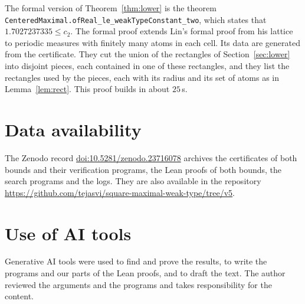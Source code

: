 \documentclass[11pt]{amsart}
\theoremstyle{definition}
\theoremstyle{remark}
\numberwithin{equation}{section}
\newcommand{\ZENODODOI}{10.5281/zenodo.23716078}
\newcommand{\REPOURL}{https://github.com/tejasvi/square-maximal-weak-type/tree/v5}
\newcommand{\LBDEC}{1.7027237335}
\newcommand{\LEANLOWTHM}{CenteredMaximal.\allowbreak ofReal\_\allowbreak le\_\allowbreak weakType\allowbreak Constant\_\allowbreak two}
\begin{document}
The formal version of Theorem~\ref{thm:lower} is the theorem \texttt{\LEANLOWTHM}, which states that $\LBDEC\le c_2$. The formal proof extends Lin's formal proof from his lattice to periodic measures with finitely many atoms in each cell. Its data are generated from the certificate. They cut the union of the rectangles of Section~\ref{sec:lower} into disjoint pieces, each contained in one of these rectangles, and they list the rectangles used by the pieces, each with its radius and its set of atoms as in Lemma~\ref{lem:rect}. This proof builds in about $25$\,s.

\section*{Data availability}
The Zenodo record \href{https://doi.org/\ZENODODOI}{doi:\ZENODODOI} archives the certificates of both bounds and their verification programs, the Lean proofs of both bounds, the search programs and the logs. They are also available in the repository \url{\REPOURL}.

\section*{Use of AI tools}
Generative AI tools were used to find and prove the results, to write the programs and our parts of the Lean proofs, and to draft the text. The author reviewed the arguments and the programs and takes responsibility for the content.
\end{document}

